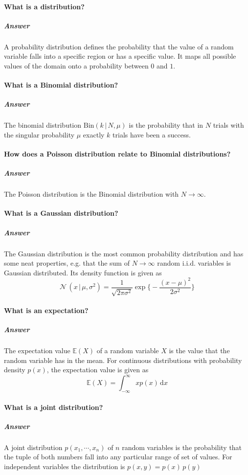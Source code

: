 \documentclass[a4paper, 11pt, accentcolor = tud3b]{tudreport}
\newcommand{\answer}[1]{\subparagraph{Answer} #1}
\newcommand{\E}{\ensuremath{\mathbb{E}}}
\newcommand{\given}{\ensuremath{\,\vert\,}}
\newcommand{\dif}[1]{\ensuremath{\,\mathrm{d}#1}}
\begin{document}
			\paragraph{What is a distribution?}
			\answer{A probability distribution defines the probability that the value of a random variable falls into a specific region or has a specific value. It maps all possible values of the domain onto a probability between \(0\) and \(1\).}

			\paragraph{What is a Binomial distribution?}
			\answer{The binomial distribution \(\textrm{Bin}(k \given N, \mu)\) is the probability that in \(N\) trials with the singular probability \(\mu\) exactly \(k\) trials have been a success.}

			\paragraph{How does a Poisson distribution relate to Binomial distributions?}
			\answer{The Poisson distribution is the Binomial distribution with \( N \to \infty \).}

			\paragraph{What is a Gaussian distribution?}
			\answer{The Gaussian distribution is the most common probability distribution and has some neat properties, e.g. that the sum of \( N \to \infty \) random i.i.d. variables is Gaussian distributed. Its density function is given as \[ \mathcal{N}\,(x \given \mu, \sigma^2) = \frac{1}{\sqrt{2\pi\sigma^2}} \exp\Bigg\{ -\frac{(x - \mu)^2}{2\sigma^2} \Bigg\} \]}

			\paragraph{What is an expectation?}
			\answer{The expectation value \(\E(X)\) of a random variable \(X\) is the value that the random variable has in the mean. For continuous distributions with probability density \( p(x) \), the expectation value is given as \[ \E(X) = \int_{-\infty}^{\infty} x p(x) \dif{x} \]}

			\paragraph{What is a joint distribution?}
			\answer{A joint distribution \( p(x_1, \cdots, x_n) \) of \(n\) random variables is the probability that the tuple of both numbers fall into any particular range of set of values. For independent variables the distribution is \( p(x, y) = p(x) \, p(y) \)}
\end{document}
